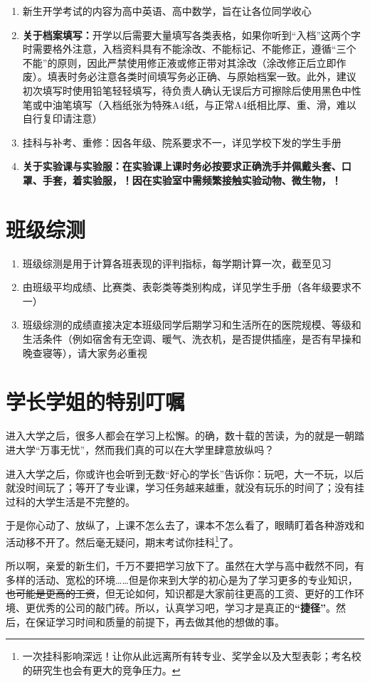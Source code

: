 \begin{enumerate}
    \item 新生开学考试\footnotemark 的内容为高中英语、高中数学，旨在让各位同学收心
    \item \textbf{关于档案填写：}开学以后需要大量填写各类表格，如果你听到“入档”这两个字时需要格外注意，入档资料具有不能涂改、不能标记、不能修正，遵循“三个不能”的原则，因此严禁使用修正液或修正带对其涂改（涂改修正后立即作废）。填表时务必注意各类时间填写务必正确、与原始档案一致。此外，建议初次填写时使用铅笔轻轻填写，待负责人确认无误后方可擦除后使用黑色中性笔或中油笔填写（入档纸张为特殊A4纸，与正常A4纸相比厚、重、滑，难以自行复印请注意）
    \item 挂科与补考、重修：因各年级、院系要求不一，详见学校下发的学生手册
    \item \textbf{关于实验课与实验服：在实验课上课时务必按要求正确洗手并佩戴头套、口罩、手套，着实验服，！因在实验室中需频繁接触实验动物、微生物，！}
\end{enumerate}

\section[班级综测]{班级综测}
\label{class_evaluation}
\begin{enumerate}
    \item 班级综测是用于计算各班表现的评判指标，每学期计算一次，截至见习
    \item 由班级平均成绩、比赛类、表彰类等类别构成，详见学生手册（各年级要求不一）
    \item 班级综测的成绩\footnotemark 直接决定本班级同学后期学习和生活所在的医院规模、等级和生活条件（例如宿舍有无空调、暖气、洗衣机，是否提供插座，是否有早操和晚查寝\footnotemark 等），请大家务必重视
\end{enumerate}

\section[学长学姐的特别叮嘱]{学长学姐的特别叮嘱}

进入大学之后，很多人都会在学习上松懈。的确，数十载的苦读，为的就是一朝踏进大学“万事无忧”，然而我们真的可以在大学里肆意放纵吗？

进入大学之后，你或许也会听到无数“好心的学长”告诉你：玩吧，大一不玩，以后就没时间玩了；等开了专业课，学习任务越来越重，就没有玩乐的时间了；没有挂过科的大学生活是不完整的。

于是你心动了、放纵了，上课不怎么去了，课本不怎么看了，眼睛盯着各种游戏和活动移不开了。然后毫无疑问，期末考试你挂科\footnote{一次挂科影响深远！让你从此远离所有转专业、奖学金以及大型表彰；考名校的研究生也会有更大的竞争压力。}了。

所以啊，亲爱的新生们，千万不要把学习放下了。虽然在大学与高中截然不同，有多样的活动、宽松的环境……但是你来到大学的初心是为了学习更多的专业知识，\sout{也可能是更高的工资}，但无论如何，知识都是大家前往更高的工资、更好的工作环境、更优秀的公司的敲门砖。所以，认真学习吧，学习才是真正的\textbf{“捷径”}。然后，在保证学习时间和质量的前提下，再去做其他的想做的事。
